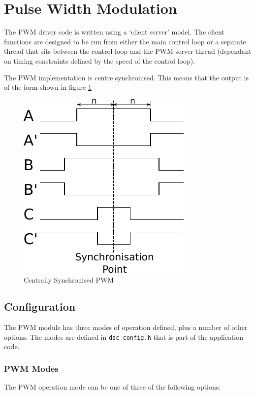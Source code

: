 \section{Pulse Width Modulation}
The PWM driver code is written using a `client server' model. The client functions are designed to be run from either the main control loop or a separate thread that sits between the control loop and the PWM server thread (dependant on timing constraints defined by the speed of the control loop).

The PWM implementation is centre synchronised. This means that the output is of the form shown in figure \ref{fig_PwmOutputExample}

\begin{figure}[h]
\begin{center}
\includegraphics{images/pwmFig.pdf}
\caption{Centrally Synchronised PWM}
\label{fig_PwmOutputExample}
\end{center}
\end{figure}


\subsection{Configuration}
The PWM module has three modes of operation defined, plus a number of other options. The modes are defined in \verb=dsc_config.h= that is part of the application code. 

\subsubsection{PWM Modes}
The PWM operation mode can be one of three of the following options:

